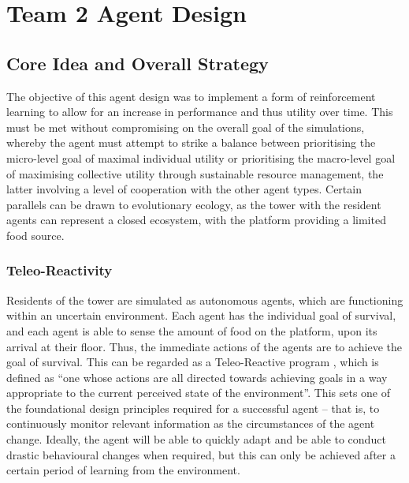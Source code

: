 \chapter{Team 2 Agent Design}\label{team_2_agent_design}


\section{Core Idea and Overall Strategy}
The objective of this agent design was to implement a form of reinforcement learning to allow for an increase in performance and thus utility over time. This must be met without compromising on the overall goal of the simulations, whereby the agent must attempt to strike a balance between prioritising the micro-level goal of maximal individual utility or prioritising the macro-level goal of maximising collective utility through sustainable resource management, the latter involving a level of cooperation with the other agent types. Certain parallels can be drawn to evolutionary ecology, as the tower with the resident agents can represent a closed ecosystem, with the platform providing a limited food source.
\subsection{Teleo-Reactivity}
Residents of the tower are simulated as autonomous agents, which are functioning within an uncertain environment. Each agent has the individual goal of survival, and each agent is able to sense the amount of food on the platform, upon its arrival at their floor. Thus, the immediate actions of the agents are to achieve the goal of survival. This can be regarded as a Teleo-Reactive program \cite{NilssonN1994TPfA}, which is defined as “one whose actions are all directed towards achieving goals in a way appropriate to the current perceived state of the environment”. This sets one of the foundational design principles required for a successful agent – that is, to continuously monitor relevant information as the circumstances of the agent change. Ideally, the agent will be able to quickly adapt and be able to conduct drastic behavioural changes when required, but this can only be achieved after a certain period of learning from the environment. 
